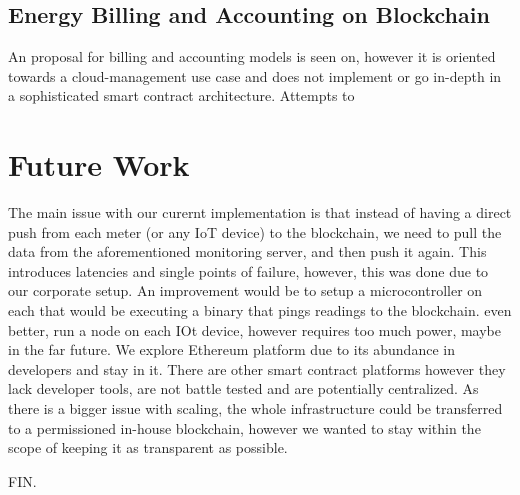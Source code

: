 \subsection{Energy Billing and Accounting on Blockchain}
An proposal for billing and accounting models is seen on\cite{billaccount}, however it is oriented towards a cloud-management use case and does not implement or go in-depth in a sophisticated smart contract architecture. Attempts to 


\section{Future Work}
The main issue with our curernt implementation is that instead of having a direct push from each meter (or any IoT device) to the blockchain, we need to pull the data from the aforementioned monitoring server, and then push it again. This introduces latencies and single points of failure, however, this was done due to our corporate setup. An improvement would be to setup a microcontroller on each that would be executing a binary that pings readings to the blockchain. even better, run a node on each IOt device, however requires too much power, maybe in the far future. We explore Ethereum platform due to its abundance in developers and stay in it. There are other smart contract platforms however they lack developer tools, are not battle tested and are potentially centralized. As there is a bigger issue with scaling, the whole infrastructure could be transferred to a permissioned in-house blockchain, however we wanted to stay within the scope of keeping it as transparent as possible.

FIN.